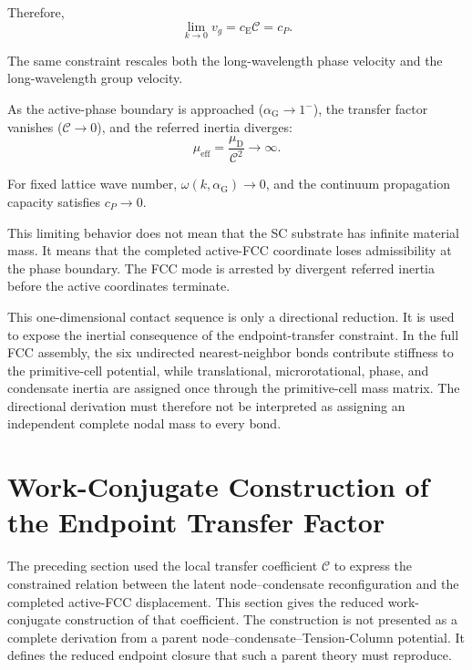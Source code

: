 Therefore,
\begin{equation}
    \lim_{k\rightarrow0}v_g = c_{\mathrm{E}}\mathcal{C} = c_P.
\end{equation}

The same constraint rescales both the long-wavelength phase velocity and the long-wavelength group velocity.

As the active-phase boundary is approached ($\alpha_{\mathrm{G}} \rightarrow 1^-$), the transfer factor vanishes ($\mathcal{C} \rightarrow 0$), and the referred inertia diverges:
\begin{equation}
    \mu_{\mathrm{eff}} = \frac{\mu_{\mathrm{D}}}{\mathcal{C}^2} \rightarrow \infty.
\end{equation}

For fixed lattice wave number, $\omega(k,\alpha_{\mathrm{G}}) \rightarrow 0$, and the continuum propagation capacity satisfies $c_P \rightarrow 0$. 

This limiting behavior does not mean that the SC substrate has infinite material mass. It means that the completed active-FCC coordinate loses admissibility at the phase boundary. The FCC mode is arrested by divergent referred inertia before the active coordinates terminate.

This one-dimensional contact sequence is only a directional reduction. It is used to expose the inertial consequence of the endpoint-transfer constraint. In the full FCC assembly, the six undirected nearest-neighbor bonds contribute stiffness to the primitive-cell potential, while translational, microrotational, phase, and condensate inertia are assigned once through the primitive-cell mass matrix. The directional derivation must therefore not be interpreted as assigning an independent complete nodal mass to every bond.

\section{Work-Conjugate Construction of the Endpoint Transfer Factor}

The preceding section used the local transfer coefficient $\mathcal{C}$ to express the constrained relation between the latent node--condensate reconfiguration and the completed active-FCC displacement. This section gives the reduced work-conjugate construction of that coefficient. The construction is not presented as a complete derivation from a parent node--condensate--Tension-Column potential. It defines the reduced endpoint closure that such a parent theory must reproduce.

